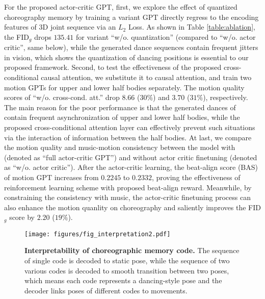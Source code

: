For the proposed actor-critic GPT, first, we explore the effect of quantized choreography memory
by training a variant GPT 
directly 
regress to the encoding features of 3D joint sequence via an $L_2$ Loss.
As shown in Table \ref{table:ablation}, the FID$_g$ drops $135.41$ for variant ``w/o. quantization'' (compared to ``w/o. actor critic'', same below), while the generated dance sequences contain frequent jitters in vision, which shows the quantization of dancing positions is essential to our proposed framework.
Second, to test the effectiveness of the proposed cross-conditional causal attention, we substitute it to causal attention, and train two motion GPTs for upper and lower half bodies separately. 
The motion quality scores of ``w/o. cross-cond. att.'' drop $8.66$ ($30\%$) and $3.70$ ($31\%$), respectively. 
The main reason for the poor performance is that the generated dances of  contain frequent asynchronization of upper and lower half bodies, while the proposed cross-conditional attention layer can effectively prevent such situations via the interaction of information between the half bodies. 
At last, we compare the motion quality and music-motion consistency between the model with (denoted as ``full actor-critic GPT'') and without actor critic finetuning (denoted as ``w/o. actor critic'').
After the actor-critic learning, the beat-align score (BAS) of motion GPT increases from $0.2245$ to $0.2332$, proving the effectiveness of reinforcement learning scheme with proposed beat-align reward.
Meanwhile, by constraining the consistency with music, the actor-critic finetuning process can also enhance the motion quanlity on choreography and saliently improves the FID$_g$ score by $2.20$ ($19\%$).




\begin{figure}[t]
    \small{
    \scriptsize
    \setlength{\tabcolsep}{1.5pt}
    \centering
    \vspace{-5pt}
    \texttt{[image: figures/fig\_interpretation2.pdf]}\\
    \vspace{-3pt}
\small\caption{\small{\textbf{Interpretability of choreographic memory code.} The sequence of single code is decoded to static pose, while the sequence of two various codes is decoded to smooth transition between two poses, which means each code represents a dancing-style pose and the decoder links poses of different codes to movements.}}
    \label{fig:ablation}}
    \vspace{-14pt}
\end{figure}

